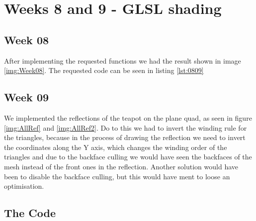 \chapter{Weeks 8 and 9 - GLSL shading}

  \section{Week 08}

    After implementing the requested functions we had the result shown in
    image \ref{img:Week08}. The requested code can be seen in listing
    \ref{lst:0809}

  \section{Week 09}

    We implemented the reflections of the teapot on the plane quad, as seen in figure \ref{img:AllRef} and
    \ref{img:AllRef2}.
    Do to this we had to invert the winding rule for the triangles, because in the process
    of drawing the reflection we need to invert the coordinates along the Y axis, which
    changes the winding order of the triangles and due to the backface culling we would have
    seen the backfaces of the mesh instead of the front ones in the reflection. Another solution
    would have been to disable the backface culling, but this would have ment to loose an
    optimisation.



  \section{The Code}

